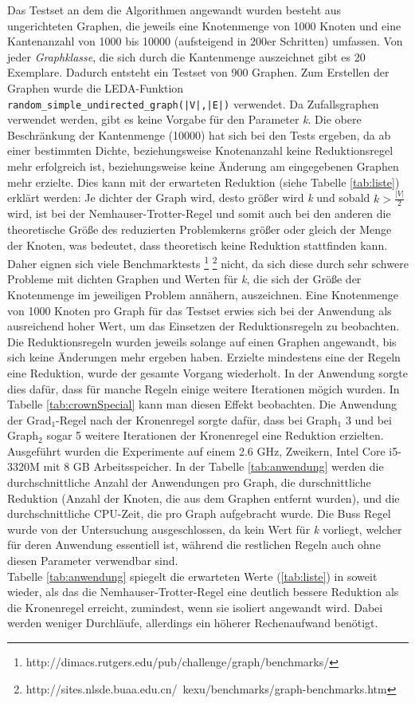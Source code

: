Das Testset an dem die Algorithmen angewandt wurden besteht aus ungerichteten Graphen, die jeweils eine Knotenmenge von 1000 Knoten und eine Kantenanzahl von 1000 bis 10000 (aufsteigend in 200er Schritten) umfassen. Von jeder \emph{Graphklasse}, die sich durch die Kantenmenge auszeichnet gibt es 20 Exemplare. Dadurch entsteht ein Testset von 900 Graphen. Zum Erstellen der Graphen wurde die LEDA-Funktion \lstinline{random_simple_undirected_graph(|V|,|E|)} \cite{manual} verwendet. Da Zufallsgraphen verwendet werden, gibt es keine Vorgabe für den Parameter \emph{k}. Die obere Beschränkung der Kantenmenge (10000) hat sich bei den Tests ergeben, da ab einer bestimmten Dichte, beziehungsweise Knotenanzahl keine Reduktionsregel mehr erfolgreich ist, beziehungsweise keine Änderung am eingegebenen Graphen mehr erzielte. Dies kann mit der erwarteten Reduktion (siehe Tabelle \ref{tab:liste}) erklärt werden: Je dichter der Graph wird, desto größer wird \emph{k} und sobald $k>\frac{|V|}{2}$ wird, ist bei der Nemhauser-Trotter-Regel und somit auch bei den anderen die theoretische Größe des reduzierten Problemkerns größer oder gleich der Menge der Knoten, was bedeutet, dass theoretisch keine Reduktion stattfinden kann. Daher eignen sich viele Benchmarktests \footnote{http://dimacs.rutgers.edu/pub/challenge/graph/benchmarks/} \footnote{http://sites.nlsde.buaa.edu.cn/~kexu/benchmarks/graph-benchmarks.htm} nicht, da sich diese durch sehr schwere Probleme mit dichten Graphen und Werten für \emph{k}, die sich der Größe der Knotenmenge im jeweiligen Problem annähern, auszeichnen. Eine Knotenmenge von 1000 Knoten pro Graph für das Testset erwies sich bei der Anwendung als ausreichend hoher Wert, um das Einsetzen der Reduktionsregeln zu beobachten.\\
Die Reduktionsregeln wurden jeweils solange auf einen Graphen angewandt, bis sich keine Änderungen mehr ergeben haben. Erzielte mindestens eine der Regeln eine Reduktion, wurde der gesamte Vorgang wiederholt. In der Anwendung sorgte dies dafür, dass für manche Regeln einige weitere Iterationen mögich wurden. In Tabelle \ref{tab:crownSpecial} kann man diesen Effekt beobachten. Die Anwendung der Grad$_{1}$-Regel nach der Kronenregel sorgte dafür, dass bei Graph$_{1}$ 3 und bei Graph$_{2}$ sogar 5 weitere Iterationen der Kronenregel eine Reduktion erzielten.
 Ausgeführt wurden die Experimente auf einem 2.6 GHz, Zweikern, Intel Core i5-3320M mit 8 GB Arbeitsspeicher. In der Tabelle \ref{tab:anwendung} werden die durchschnittliche Anzahl der Anwendungen pro Graph, die durschnittliche Reduktion (Anzahl der Knoten, die aus dem Graphen entfernt wurden), und die durchschnittliche CPU-Zeit, die pro Graph aufgebracht wurde. Die Buss Regel wurde von der Untersuchung ausgeschlossen, da kein Wert für \emph{k} vorliegt, welcher für deren Anwendung essentiell ist, während die restlichen Regeln auch ohne diesen Parameter verwendbar sind.\\
Tabelle \ref{tab:anwendung} spiegelt die erwarteten Werte (\ref{tab:liste}) in soweit wieder, als das die Nemhauser-Trotter-Regel eine deutlich bessere Reduktion als die Kronenregel erreicht, zumindest, wenn sie isoliert angewandt wird. Dabei werden weniger Durchläufe, allerdings ein höherer Rechenaufwand benötigt.

